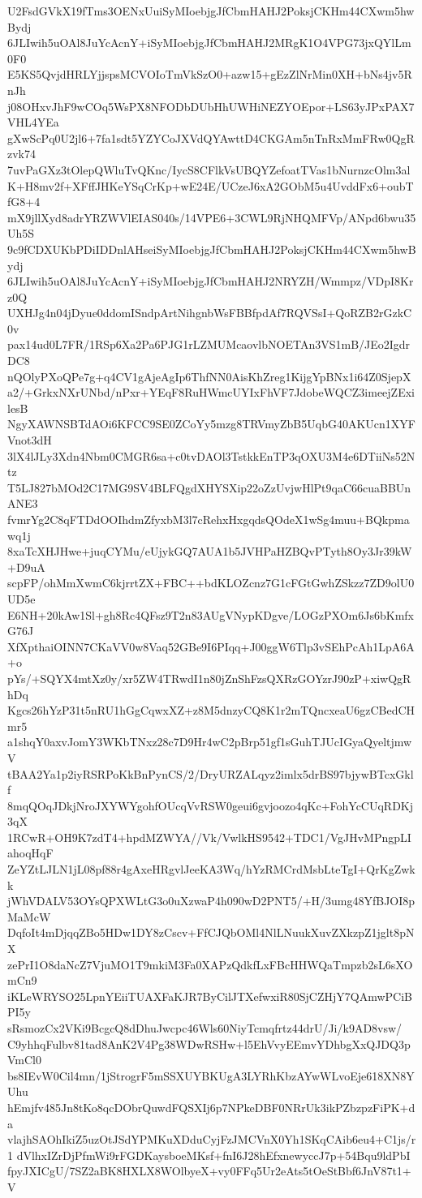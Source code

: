 U2FsdGVkX19fTms3OENxUuiSyMIoebjgJfCbmHAHJ2PoksjCKHm44CXwm5hwBydj
6JLIwih5uOAl8JuYcAcnY+iSyMIoebjgJfCbmHAHJ2MRgK1O4VPG73jxQYlLm0F0
E5KS5QvjdHRLYjjspsMCVOIoTmVkSzO0+azw15+gEzZlNrMin0XH+bNs4jv5RnJh
j08OHxvJhF9wCOq5WsPX8NFODbDUbHhUWHiNEZYOEpor+LS63yJPxPAX7VHL4YEa
gXwScPq0U2jl6+7fa1sdt5YZYCoJXVdQYAwttD4CKGAm5nTnRxMmFRw0QgRzvk74
7uvPaGXz3tOlepQWluTvQKnc/IycS8CFlkVsUBQYZefoatTVas1bNurnzcOlm3al
K+H8mv2f+XFffJHKeYSqCrKp+wE24E/UCzeJ6xA2GObM5u4UvddFx6+oubTfG8+4
mX9jllXyd8adrYRZWVlEIAS040s/14VPE6+3CWL9RjNHQMFVp/ANpd6bwu35Uh5S
9c9fCDXUKbPDiIDDnlAHseiSyMIoebjgJfCbmHAHJ2PoksjCKHm44CXwm5hwBydj
6JLIwih5uOAl8JuYcAcnY+iSyMIoebjgJfCbmHAHJ2NRYZH/Wmmpz/VDpI8Krz0Q
UXHJg4n04jDyue0ddomISndpArtNihgnbWsFBBfpdAf7RQVSsI+QoRZB2rGzkC0v
pax14ud0L7FR/1RSp6Xa2Pa6PJG1rLZMUMcaovlbNOETAn3VS1mB/JEo2IgdrDC8
nQOlyPXoQPe7g+q4CV1gAjeAgIp6ThfNN0AisKhZreg1KijgYpBNx1i64Z0SjepX
a2/+GrkxNXrUNbd/nPxr+YEqF8RuHWmcUYIxFhVF7JdobeWQCZ3imeejZExilesB
NgyXAWNSBTdAOi6KFCC9SE0ZCoYy5mzg8TRVmyZbB5UqbG40AKUcn1XYFVnot3dH
3lX4lJLy3Xdn4Nbm0CMGR6sa+c0tvDAOl3TstkkEnTP3qOXU3M4e6DTiiNs52Ntz
T5LJ827bMOd2C17MG9SV4BLFQgdXHYSXip22oZzUvjwHlPt9qaC66cuaBBUnANE3
fvmrYg2C8qFTDdOOIhdmZfyxbM3l7cRehxHxgqdsQOdeX1wSg4muu+BQkpmawq1j
8xaTcXHJHwe+juqCYMu/eUjykGQ7AUA1b5JVHPaHZBQvPTyth8Oy3Jr39kW+D9uA
scpFP/ohMmXwmC6kjrrtZX+FBC++bdKLOZcnz7G1cFGtGwhZSkzz7ZD9olU0UD5e
E6NH+20kAw1Sl+gh8Rc4QFsz9T2n83AUgVNypKDgve/LOGzPXOm6Js6bKmfxG76J
XfXpthaiOINN7CKaVV0w8Vaq52GBe9I6PIqq+J00ggW6Tlp3vSEhPcAh1LpA6A+o
pYs/+SQYX4mtXz0y/xr5ZW4TRwdI1n80jZnShFzsQXRzGOYzrJ90zP+xiwQgRhDq
Kgcs26hYzP31t5nRU1hGgCqwxXZ+z8M5dnzyCQ8K1r2mTQncxeaU6gzCBedCHmr5
a1shqY0axvJomY3WKbTNxz28c7D9Hr4wC2pBrp51gf1sGuhTJUcIGyaQyeltjmwV
tBAA2Ya1p2iyRSRPoKkBnPynCS/2/DryURZALqyz2imlx5drBS97bjywBTcxGklf
8mqQOqJDkjNroJXYWYgohfOUcqVvRSW0geui6gvjoozo4qKc+FohYcCUqRDKj3qX
1RCwR+OH9K7zdT4+hpdMZWYA//Vk/VwlkHS9542+TDC1/VgJHvMPngpLIahoqHqF
ZeYZtLJLN1jL08pf88r4gAxeHRgvlJeeKA3Wq/hYzRMCrdMsbLteTgI+QrKgZwkk
jWhVDALV53OYsQPXWLtG3o0uXzwaP4h090wD2PNT5/+H/3umg48YfBJOI8pMaMcW
DqfoIt4mDjqqZBo5HDw1DY8zCscv+FfCJQbOMl4NlLNuukXuvZXkzpZ1jglt8pNX
zePrI1O8daNcZ7VjuMO1T9mkiM3Fa0XAPzQdkfLxFBcHHWQaTmpzb2sL6sXOmCn9
iKLeWRYSO25LpnYEiiTUAXFaKJR7ByCilJTXefwxiR80SjCZHjY7QAmwPCiBPI5y
sRsmozCx2VKi9BcgcQ8dDhuJwcpc46Wls60NiyTcmqfrtz44drU/Ji/k9AD8vsw/
C9yhhqFulbv81tad8AnK2V4Pg38WDwRSHw+l5EhVvyEEmvYDhbgXxQJDQ3pVmCl0
bs8IEvW0Cil4mn/1jStrogrF5mSSXUYBKUgA3LYRhKbzAYwWLvoEje618XN8YUhu
hEmjfv485Jn8tKo8qcDObrQuwdFQSXIj6p7NPkeDBF0NRrUk3ikPZbzpzFiPK+da
vlajhSAOhIkiZ5uzOtJSdYPMKuXDduCyjFzJMCVnX0Yh1SKqCAib6eu4+C1js/r1
dVlhxIZrDjPfmWi9rFGDKaysboeMKsf+fnI6J28hEfxnewyccJ7p+54Bqu9ldPbI
fpyJXICgU/7SZ2aBK8HXLX8WOlbyeX+vy0FFq5Ur2eAts5tOeStBbf6JnV87t1+V
